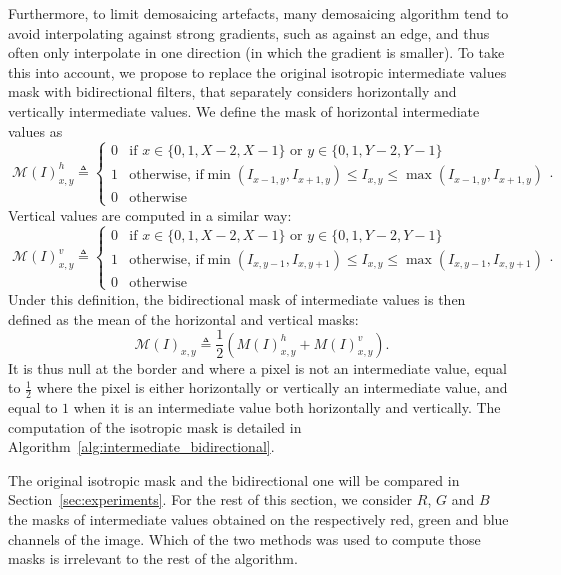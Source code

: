 \documentclass{ipol}
\begin{document}
Furthermore, to limit demosaicing artefacts, many demosaicing algorithm tend to avoid interpolating against strong gradients, such as against an edge, and thus often only interpolate in one direction (in which the gradient is smaller). To take this into account, we propose to replace the original isotropic intermediate values mask with bidirectional filters, that separately considers horizontally and vertically intermediate values. We define the mask of horizontal intermediate values as
\[\phantom.\mathcal M(I)^h_{x, y} \triangleq \left\{\begin{array}{ll}
        0 &\text{if }x\in\{0, 1, X-2, X-1\}\text{ or }y\in\{0, 1, Y-2, Y-1\}\\
        1 &\text{otherwise, if}\min(I_{x-1, y}, I_{x+1, y}) \leq I_{x, y} \leq \max(I_{x-1, y}, I_{x+1, y})\\
0 &\text{otherwise}\end{array}\right..\]
Vertical values are computed in a similar way:
\[\phantom.\mathcal M(I)^v_{x, y} \triangleq \left\{\begin{array}{ll}
        0 &\text{if }x\in\{0, 1, X-2, X-1\}\text{ or }y\in\{0, 1, Y-2, Y-1\}\\
        1 &\text{otherwise, if}\min(I_{x, y-1}, I_{x, y+1}) \leq I_{x, y} \leq \max(I_{x, y-1}, I_{x, y+1})\\
0 &\text{otherwise}\end{array}\right..\]
Under this definition, the bidirectional mask of intermediate values is then defined as the mean of the horizontal and vertical masks:
\[\phantom.\mathcal M(I)_{x, y} \triangleq\frac 1 2 \left(M(I)^h_{x, y} + M(I)^v_{x, y}\right).\]
It is thus null at the border and where a pixel is not an intermediate value, equal to $\frac 1 2$ where the pixel is either horizontally or vertically an intermediate value, and equal to $1$ when it is an intermediate value both horizontally and vertically. The computation of the isotropic mask is detailed in Algorithm~\ref{alg:intermediate_bidirectional}.

The original isotropic mask and the bidirectional one will be compared in Section~\ref{sec:experiments}. For the rest of this section, we consider $R$, $G$ and $B$ the masks of intermediate values obtained on the respectively red, green and blue channels of the image. Which of the two methods was used to compute those masks is irrelevant to the rest of the algorithm.
\end{document}
